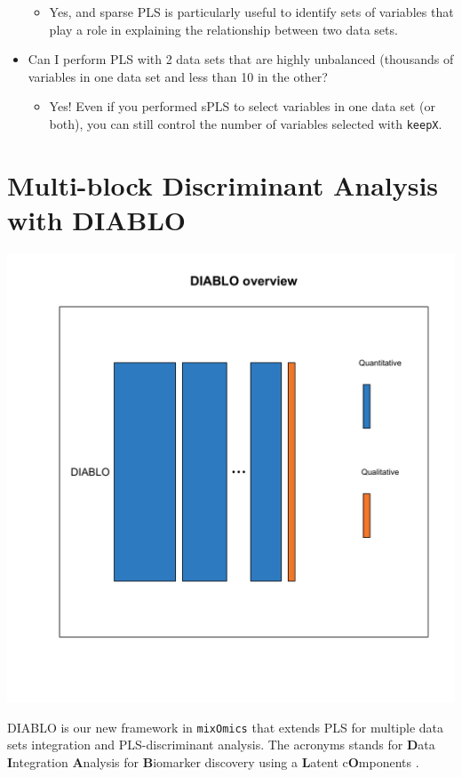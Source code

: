 \documentclass[]{book}
\providecommand{\tightlist}{%
  \setlength{\itemsep}{0pt}\setlength{\parskip}{0pt}}
\begin{document}
\begin{itemize}
  \begin{itemize}
  \tightlist
  \item
    Yes, and sparse PLS is particularly useful to identify sets of variables that play a role in explaining the relationship between two data sets.
  \end{itemize}
\item
  Can I perform PLS with 2 data sets that are highly unbalanced (thousands of variables in one data set and less than 10 in the other?

  \begin{itemize}
  \tightlist
  \item
    Yes! Even if you performed sPLS to select variables in one data set (or both), you can still control the number of variables selected with \texttt{keepX}.
  \end{itemize}
\end{itemize}

\hypertarget{diablo}{%
\chapter{Multi-block Discriminant Analysis with DIABLO}\label{diablo}}

\begin{center}\includegraphics[width=0.75\linewidth,]{Figures/06-overview-DIABLO-1} \end{center}

DIABLO is our new framework in \texttt{mixOmics} that extends PLS for multiple data sets integration and PLS-discriminant analysis. The acronyms stands for \textbf{D}ata \textbf{I}ntegration \textbf{A}nalysis for \textbf{B}iomarker discovery using a \textbf{L}atent c\textbf{O}mponents \citep{Sin16}.
\end{document}

